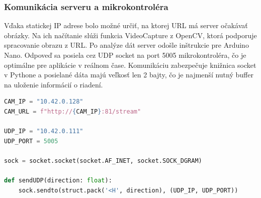 \subsubsection{Komunikácia serveru a mikrokontroléra}
Vďaka statickej IP adrese bolo možné určiť, na ktorej URL má server očakávať obrázky. Na ich načítanie slúži funkcia VideoCapture z OpenCV, ktorá podporuje spracovanie obrazu z URL. Po analýze dát server odošle inštrukcie pre Arduino Nano. Odpoveď sa posiela cez UDP socket na port 5005 mikrokontroléra, čo je optimálne pre aplikácie v reálnom čase. Komunikáciu zabezpečuje knižnica socket v Pythone a posielané dáta majú veľkosť len 2 bajty, čo je najmenší nutný buffer na uloženie informácií o riadení.\par
\begin{lstlisting}[language=Python, caption=Posielanie UDP packetov]
CAM_IP = "10.42.0.128"
CAM_URL = f"http://{CAM_IP}:81/stream"

UDP_IP = "10.42.0.111"
UDP_PORT = 5005

sock = socket.socket(socket.AF_INET, socket.SOCK_DGRAM)

def sendUDP(direction: float):
    sock.sendto(struct.pack('<H', direction), (UDP_IP, UDP_PORT))
\end{lstlisting}
